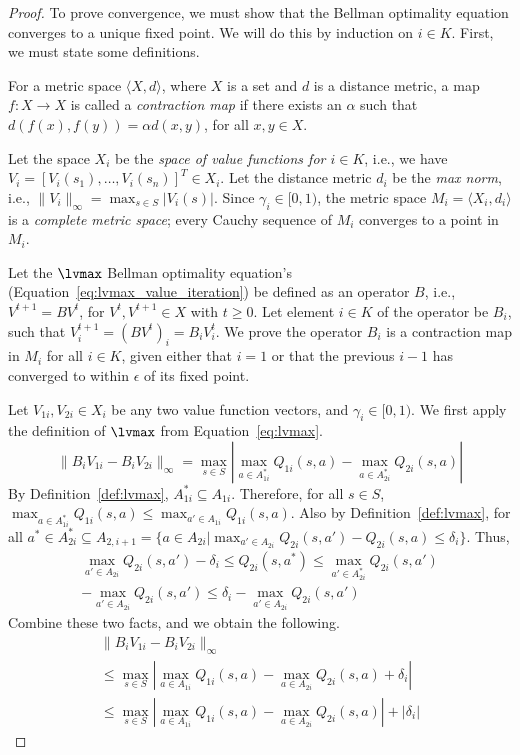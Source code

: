 \begin{proof}
To prove convergence, we must show that the Bellman optimality equation converges to a unique fixed point. We will do this by induction on $i \in K$. First, we must state some definitions.

For a metric space $\langle X, d \rangle$, where $X$ is a set and $d$ is a distance metric, a map $f : X \rightarrow X$ is called a \emph{contraction map} if there exists an $\alpha$ such that $d(f(x), f(y)) = \alpha d(x, y)$, for all $x, y \in X$.

Let the space $X_i$ be the \emph{space of value functions for $i \in K$}, i.e., we have $V_i = [V_i(s_1), \ldots, V_i(s_n)]^T \in X_i$. Let the distance metric $d_i$ be the \emph{max norm}, i.e., $\|V_i\|_\infty = \max_{s \in S} |V_i(s)|$. Since $\gamma_i \in [0, 1)$, the metric space $M_i = \langle X_i, d_i \rangle$ is a \emph{complete metric space}; every Cauchy sequence of $M_i$ converges to a point in $M_i$.

Let the $\lvmax$ Bellman optimality equation's (Equation~\ref{eq:lvmax_value_iteration}) be defined as an operator $B$, i.e., $V^{t+1} = B V^t$, for $V^t, V^{t+1} \in X$ with $t \geq 0$. Let element $i \in K$ of the operator be $B_i$, such that $V_i^{t+1} = (B V^t)_i = B_i V_i^t$. We prove the operator $B_i$ is a contraction map in $M_i$ for all $i \in K$, given either that $i=1$ or that the previous $i-1$ has converged to within $\epsilon$ of its fixed point.

Let $V_{1i}, V_{2i} \in X_i$ be any two value function vectors, and $\gamma_i \in [0, 1)$. We first apply the definition of $\lvmax$ from Equation~\ref{eq:lvmax}.
\begin{equation*}
    \| B_i V_{1i} - B_i V_{2i} \|_\infty = \max_{s \in S} | \max_{a \in A_{1i}^*} Q_{1i}(s, a) - \max_{a \in A_{2i}^*} Q_{2i}(s, a) |
\end{equation*}
By Definition~\ref{def:lvmax}, $A_{1i}^* \subseteq A_{1i}$. Therefore, for all $s \in S$, $\max_{a \in A_{1i}^*} Q_{1i}(s, a) \leq \max_{a' \in A_{1i}} Q_{1i}(s, a)$. Also by Definition~\ref{def:lvmax}, for all $a^* \in A_{2i}^* \subseteq A_{2,i+1} = \{a \in A_{2i} | \max_{a' \in A_{2i}} Q_{2i}(s, a') - Q_{2i}(s, a) \leq \delta_i \}$. Thus,
\begin{multline*}
    \max_{a' \in A_{2i}} Q_{2i}(s, a') - \delta_i \leq Q_{2i}(s, a^*) \leq \max_{a' \in A_{2i}^*} Q_{2i} (s, a') \\
    -\max_{a' \in A_{2i}} Q_{2i} (s, a') \leq \delta_i - \max_{a' \in A_{2i}} Q_{2i}(s, a')
\end{multline*}
Combine these two facts, and we obtain the following.
\begin{multline*}
    \| B_i V_{1i} - B_i V_{2i} \|_\infty \\
    \leq \max_{s \in S} | \max_{a \in A_{1i}} Q_{1i}(s, a) - \max_{a \in A_{2i}} Q_{2i}(s, a) + \delta_i | \\
    \leq \max_{s \in S} | \max_{a \in A_{1i}} Q_{1i}(s, a) - \max_{a \in A_{2i}} Q_{2i}(s, a)| + |\delta_i|
\end{multline*}


\end{proof}
